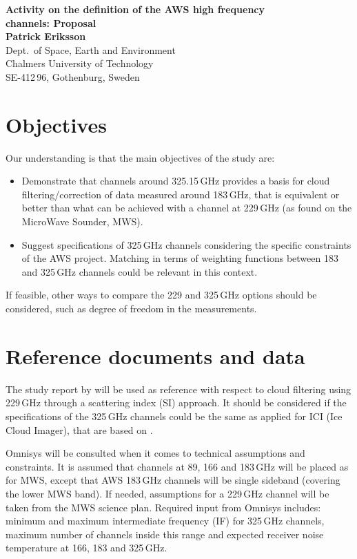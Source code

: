 \documentclass[BCOR=1cm,12pt,bibliography=totoc]{article}
\begin{document}
\noindent
\textbf{{\Large Activity on the definition of the AWS
high frequency\vspace{0.5ex}\\channels: Proposal}}  \vspace{5mm}\\
{\bf Patrick Eriksson}\\
Dept.\ of Space, Earth and Environment\\
Chalmers University of Technology\\
SE-412\,96, Gothenburg, Sweden \vspace{10mm}


\section{Objectives}
\label{sec:objectives}
%
Our understanding is that the main objectives of the study are:
\begin{itemize}
\item Demonstrate that channels around 325.15\,GHz provides a basis for cloud
  filtering/correction of data measured around 183\,GHz, that is equivalent
  or better than what can be achieved with a channel at 229\,GHz (as found on
  the MicroWave Sounder, MWS). 
\item Suggest specifications of 325\,GHz channels considering the specific
  constraints of the AWS project. Matching in terms of weighting functions between
  183 and 325\,GHz channels could be relevant in this context.
\end{itemize}
If feasible, other ways to compare the 229 and 325\,GHz options should be
considered, such as degree of freedom in the measurements.


\section{Reference documents and data}
\label{sec:info}
%
The study report by \citet{rekha2012potential} will be used as reference with
respect to cloud filtering using 229\,GHz through a scattering index (SI)
approach. It should be considered if the specifications of the 325\,GHz
channels could be the same as applied for ICI (Ice Cloud Imager), that are
based on \citet{buehler:obser:12}.

Omnisys will be consulted when it comes to technical assumptions and
constraints. It is assumed that channels at 89, 166 and 183\,GHz will be placed
as for MWS, except that AWS 183\,GHz channels will be single sideband (covering
the lower MWS band). If needed, assumptions for a 229\,GHz channel will be
taken from the MWS science plan. Required input from Omnisys includes: minimum
and maximum intermediate frequency (IF) for 325\,GHz channels, maximum number
of channels inside this range and expected receiver noise temperature at 166,
183 and 325\,GHz.
\end{document}
